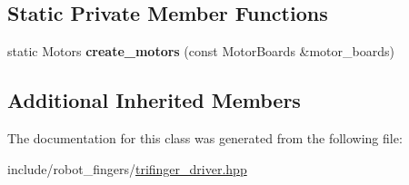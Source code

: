 \subsection*{Static Private Member Functions}
\begin{DoxyCompactItemize}
\item 
\mbox{\label{classrobot__fingers_1_1TriFingerDriver_aadad79c20c522db342cb13ea9d7f53fa}} 
static Motors {\bfseries create\+\_\+motors} (const Motor\+Boards \&motor\+\_\+boards)
\end{DoxyCompactItemize}
\subsection*{Additional Inherited Members}


The documentation for this class was generated from the following file\+:\begin{DoxyCompactItemize}
\item 
include/robot\+\_\+fingers/\hyperlink{trifinger__driver_8hpp}{trifinger\+\_\+driver.\+hpp}\end{DoxyCompactItemize}
